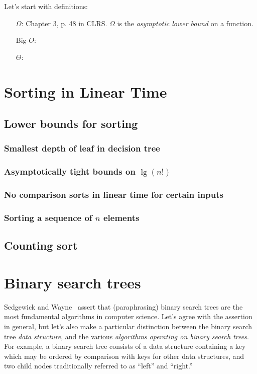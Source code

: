 \documentclass{article}
\begin{document}
Let's start with definitions:

\begin{itemize}
  \item [$\Omega$:] Chapter 3, p. 48 in CLRS. $\Omega$ is the \emph{asymptotic lower
  bound} on a function.
  \item [Big-$O$:]
  \item [$\Theta$:]
\end{itemize}




\setcounter{section}{7}
\section{Sorting in Linear Time}\label{sec:lineartime}

\subsection{Lower bounds for sorting}

\subsubsection{Smallest depth of leaf in decision tree}

\subsubsection{Asymptotically tight bounds on $\lg(n!)$}

\subsubsection{No comparison sorts in linear time for certain inputs}

\subsubsection{Sorting a sequence of $n$ elements}

\subsection{Counting sort}

\setcounter{section}{11}
\section{Binary search trees}

Sedgewick and Wayne~\cite{sedgewick:r2011} assert that (paraphrasing)
binary search trees are the most fundamental algorithms
in computer science. Let's agree with the assertion in
general, but let's also make a particular distinction between the
binary search tree \emph{data structure}, and the various
\emph{algorithms operating on binary search trees}. For example,
a binary search tree consists of a data structure containing a key
which may be ordered by comparison with keys for other data structures,
and two child nodes traditionally referred to as ``left'' and ``right.''
\end{document}

